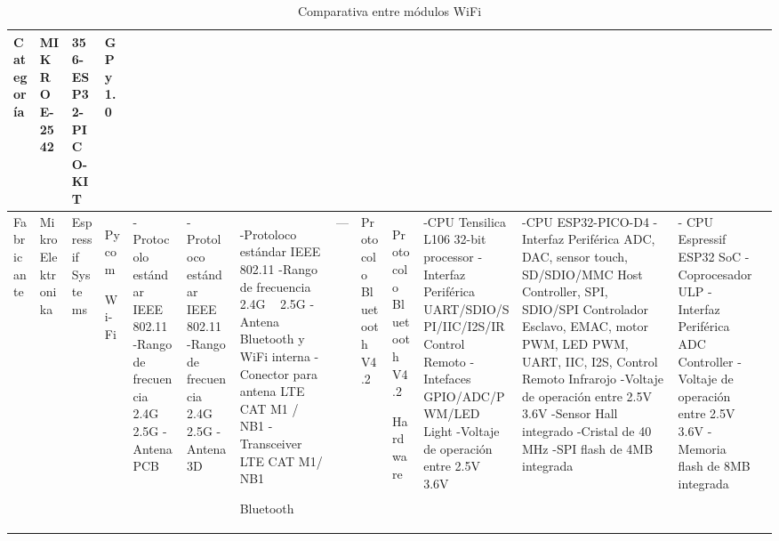 \begin{longtable}{|M{2.2cm}|M{4.0cm}|M{4.0cm}|M{4.0cm}|}
    \caption{Comparativa entre módulos WiFi}
    \label{tabla_modulosWiFi}
	\hline
	\textbf{Categoría} & \textbf{MIKROE-2542} & \textbf{356-ESP32-PICO-KIT} & \textbf{GPy 1.0} \\ \hline
	
 	Fabricante & MikroElektronika & Espressif Systems & Pycom
 	\hline
 	 
    Wi-Fi 
    &
    \newline  -Protocolo estándar IEEE 802.11
    \newline  -Rango de frecuencia 2.4G ~ 2.5G 
    \newline  -Antena PCB
	& 
    \newline  -Protoloco estándar IEEE 802.11
    \newline  -Rango de frecuencia 2.4G ~ 2.5G 
    \newline  -Antena 3D
	&   	    
    \newline  -Protoloco estándar IEEE 802.11
    \newline  -Rango de frecuencia 2.4G ~ 2.5G 
    \newline  -Antena Bluetooth y WiFi interna
    \newline  -Conector para antena LTE CAT M1 / NB1
    \newline  -Transceiver LTE CAT M1/ NB1 	
    \hline

	Bluetooth 
    &
	---
    &
	\newline Protocolo Bluetooth V4.2
	&
	\newline Protocolo Bluetooth V4.2 
	\hline
	
	Hardware &
    \newline  -CPU Tensilica L106 32-bit processor
    \newline  -Interfaz Periférica UART/SDIO/SPI/IIC/I2S/IR Control Remoto
    \newline  -Intefaces GPIO/ADC/PWM/LED Light
    \newline  -Voltaje de operación entre 2.5V ~ 3.6V
    &
    \newline  -CPU ESP32-PICO-D4
    \newline  -Interfaz Periférica ADC, DAC, sensor touch, SD/SDIO/MMC Host Controller, SPI, SDIO/SPI Controlador Esclavo, EMAC, motor PWM, LED PWM, UART, IIC, I2S, Control Remoto Infrarojo 
    \newline  -Voltaje de operación entre 2.5V ~ 3.6V
    \newline  -Sensor Hall integrado
    \newline  -Cristal de 40 MHz
    \newline  -SPI flash de 4MB integrada
    &
    \newline  - CPU Espressif ESP32 SoC
    \newline  - Coprocesador ULP
    \newline  - Interfaz Periférica ADC Controller
    \newline  - Voltaje de operación entre 2.5V ~ 3.6V
    \newline  - Memoria flash de 8MB integrada
    &
	\hline
	

\end{longtable}
